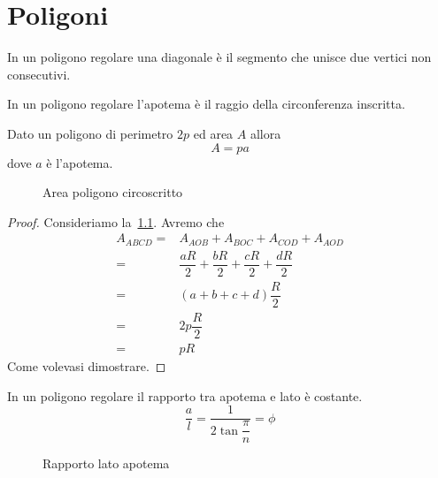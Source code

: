 \chapter{Poligoni}\label{ch:poligoni}
\begin{defn}[Diagonali]\label{defn:poligonidiagonale}
In un poligono regolare una diagonale è il segmento che unisce due vertici non consecutivi.
\end{defn}
\begin{defn}[Apotema]\label{defn:poligoniapotema}
	In un poligono regolare l'apotema è il raggio della circonferenza inscritta.
\end{defn}
\begin{thm}\label{thm:areapoligonocircoscritto}
Dato un poligono di perimetro $2p$ ed area $A$ allora 
\[A=pa\]
dove $a$ è l'apotema.
\end{thm}
\begin{figure}
	\centering
	
	\caption{Area poligono circoscritto}
	\label{fig:circonferenzainscrittapoligono}
\end{figure}
\begin{proof}
Consideriamo la~\cref{fig:circonferenzainscrittapoligono}. Avremo che
\begin{align*}
	A_{ABCD}=&A_{AOB}+A_{BOC}+A_{COD}+A_{AOD}\\
	=&\dfrac{aR}{2}+\dfrac{bR}{2}+\dfrac{cR}{2}+\dfrac{dR}{2}\\
	=&(a+b+c+d)\dfrac{R}{2}\\
	=&2p\dfrac{R}{2}\\
	=&pR
\end{align*}
Come volevasi dimostrare.
\end{proof}
\begin{thm}\label{thm:rapportoapotemalato}
In un poligono regolare il rapporto tra apotema e lato è costante.
\[\dfrac{a}{l}=\dfrac{1}{2\tan{\dfrac{\pi}{n}}}=\phi\]
\end{thm}
\begin{figure}
	\centering
	
	\caption{Rapporto lato apotema}
	\label{fig:latoapotema}
\end{figure}

